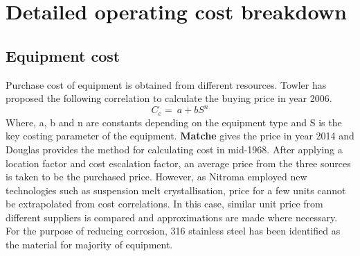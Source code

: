 \section{Detailed operating cost breakdown}
\subsection{Equipment cost}
Purchase cost of equipment is obtained from different resources. Towler\cite{sinnott_chemical_2020} has proposed the following correlation to calculate the buying price in year 2006.
\begin{equation}
    C_{e}=\ a+bS^n
\end{equation}
Where, a, b and n are constants depending on the equipment type and S is the key costing parameter of the equipment. \textbf{Matche}\cite{noauthor_matches_nodate} gives the price in year 2014 and Douglas\cite{douglas_conceptual_1988} provides the method for calculating cost in mid-1968. After applying a location factor and cost escalation factor, an average price from the three sources is taken to be the purchased price. However, as Nitroma employed new technologies such as suspension melt crystallisation, price for a few units cannot be extrapolated from cost correlations. In this case, similar unit price from different suppliers is compared and approximations are made where necessary. For the purpose of reducing corrosion, 316 stainless steel has been identified as the material for majority of equipment.

